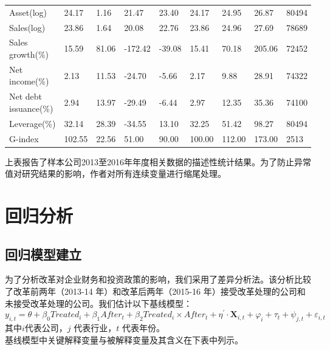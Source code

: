 \documentclass{article}
\begin{document}
\begin{table}[H]
\begin{tabularx}{\textwidth}{lXXllXXXX}
Asset(log)                      & 24.17  & 1.16  & 21.47   & 23.40  & 24.17  & 24.95  & 26.87  & 80494 \\
Sales(log)                      & 23.86  & 1.64  & 20.08   & 22.76  & 23.86  & 24.96  & 27.69  & 78689 \\
Sales growth(\%)                & 15.59  & 81.06 & -172.42 & -39.08 & 15.41  & 70.18  & 205.06 & 72452 \\
Net income(\%)                  & 2.13   & 11.53 & -24.70  & -5.66  & 2.17   & 9.88   & 28.91  & 74322 \\
Net debt issuance(\%)           & 2.94   & 13.97 & -29.49  & -6.44  & 2.97   & 12.35  & 35.36  & 74100 \\
Leverage(\%)                    & 32.14  & 28.39 & -34.55  & 13.10  & 32.25  & 51.42  & 98.27  & 80494 \\
G-index                         & 102.55 & 22.56 & 51.00   & 90.00  & 100.00 & 112.00 & 173.00 & 2513  \\ \bottomrule
\end{tabularx}

\end{table}

\vspace{-0.5cm}

\indent 上表报告了样本公司2013至2016年年度相关数据的描述性统计结果。为了防止异常值对研究结果的影响，作者对所有连续变量进行缩尾处理。

\section{回归分析}
\subsection{回归模型建立}
\indent 为了分析改革对企业财务和投资政策的影响，我们采用了差异分析法。该分析比较了改革前两年（2013-14 年）和改革后两年（2015-16 年）接受改革处理的公司和未接受改革处理的公司。我们估计以下基线模型：\begin{equation}
    y_{i, t}=\theta+\beta_{0} Treated _{i}+\beta_{1} After _{t}+\beta_{2} Treated _{i} \times After _{t}+\eta^{\prime} \cdot \mathbf{X}_{i, t}+\varphi_{i}+\tau_{t}+\psi_{j, t}+\varepsilon_{i, t}
\end{equation}
\indent 其中$i$代表公司，$j$ 代表行业，$t$ 代表年份。\\
\indent 基线模型中关键解释变量与被解释变量及其含义在下表中列示。
\end{document}
